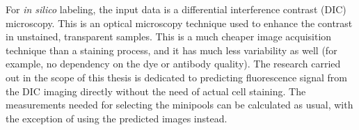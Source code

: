 For \textit{in silico} labeling, the input data is a differential interference contrast (DIC) microscopy. This is an optical microscopy technique used to enhance the contrast in unstained, transparent samples. This is a much cheaper image acquisition technique than a staining process, and it has much less variability as well (for example, no dependency on the dye or antibody quality). The research carried out in the scope of this thesis is dedicated to predicting fluorescence signal from the DIC imaging directly without the need of actual cell staining. The measurements needed for selecting the minipools can be calculated as usual, with the exception of using the predicted images instead.
